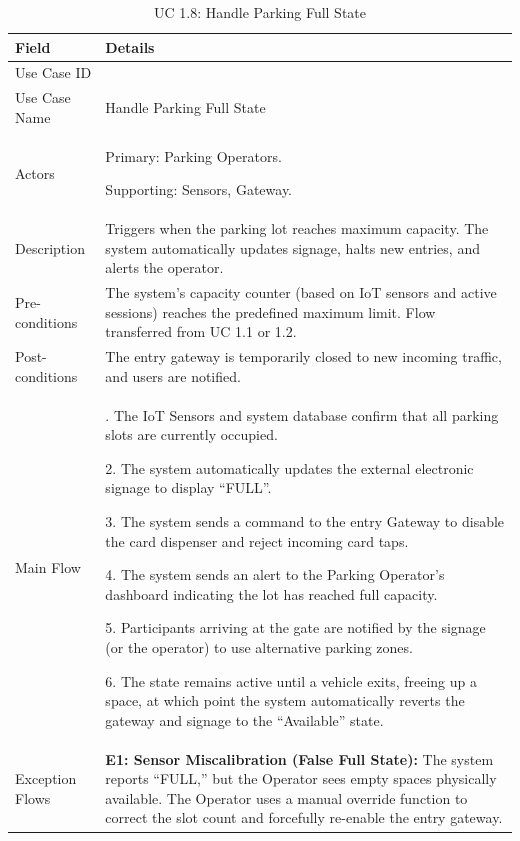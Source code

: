 \begin{table}[H]
\small
\renewcommand{\arraystretch}{1.4}
\begin{tabularx}{\textwidth}{|>{\raggedright\arraybackslash}p{3.5cm}|>{\RaggedRight\arraybackslash}X|}
\hline
\rowcolor{gray!20} \textbf{Field} & \textbf{Details} \\
\hline
Use Case ID & 1.8 \\
\hline
Use Case Name & Handle Parking Full State \\
\hline
Actors & Primary: Parking Operators. \par Supporting: Sensors, Gateway. \\
\hline
Description & Triggers when the parking lot reaches maximum capacity. The system automatically updates signage, halts new entries, and alerts the operator. \\
\hline
Pre-conditions & The system's capacity counter (based on IoT sensors and active sessions) reaches the predefined maximum limit. Flow transferred from UC 1.1 or 1.2. \\
\hline
Post-conditions & The entry gateway is temporarily closed to new incoming traffic, and users are notified. \\
\hline
Main Flow & 
1. The IoT Sensors and system database confirm that all parking slots are currently occupied. \par
2. The system automatically updates the external electronic signage to display ``FULL''. \par
3. The system sends a command to the entry Gateway to disable the card dispenser and reject incoming card taps. \par
4. The system sends an alert to the Parking Operator's dashboard indicating the lot has reached full capacity. \par
5. Participants arriving at the gate are notified by the signage (or the operator) to use alternative parking zones. \par
6. The state remains active until a vehicle exits, freeing up a space, at which point the system automatically reverts the gateway and signage to the ``Available'' state. \\
\hline
Exception Flows & 
\textbf{E1: Sensor Miscalibration (False Full State):} The system reports ``FULL,'' but the Operator sees empty spaces physically available. The Operator uses a manual override function to correct the slot count and forcefully re-enable the entry gateway. \\
\hline
\end{tabularx}
\caption{UC 1.8: Handle Parking Full State}
\label{tab:uc1.8}
\end{table}